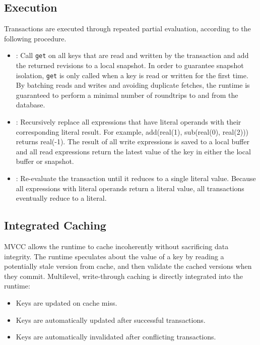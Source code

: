 \documentclass[12pt]{article}
\begin{document}
  \subsection{Execution}
    Transactions are executed through repeated partial evaluation, according to the following
    procedure.

    \begin{itemize}
      \item {}: Call \texttt{get} on all keys that are read and written by the
        transaction and add the returned revisions to a local snapshot. In order to guarantee
        snapshot isolation, \texttt{get} is only called when a key is read or written for the
        first time. By batching reads and writes and avoiding duplicate fetches, the runtime is
        guaranteed to perform a minimal number of roundtrips to and from the database.
      \item {}: Recursively replace all expressions that have literal operands with
        their corresponding literal result. For example, add(real(1), sub(real(0), real(2)))
        returns real(-1). The result of all write expressions is saved to a local buffer and all
        read expressions return the latest value of the key in either the local buffer or snapshot.
      \item {}: Re-evaluate the transaction until it reduces to a single literal
        value. Because all expressions with literal operands return a literal value, all
        transactions eventually reduce to a literal.
    \end{itemize}

  \subsection{Integrated Caching}
    MVCC allows the runtime to cache incoherently without sacrificing data integrity. The runtime
    speculates about the value of a key by reading a potentially stale version from cache, and then
    validate the cached versions when they commit. Multilevel, write-through caching is directly
    integrated into the runtime:

    \begin{itemize}
      \item Keys are updated on cache miss.
      \item Keys are automatically updated after successful transactions.
      \item Keys are automatically invalidated after conflicting transactions.
    \end{itemize}
\end{document}
